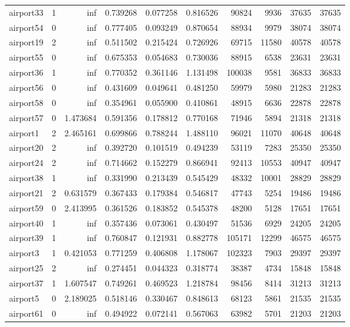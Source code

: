 \documentclass[../../../thesis.tex]{subfiles}
\begin{document}
\begin{longtable}{|l|r|r|r|r|r|r|r|r|r|}
airport33 & 1 & inf & 0.739268 & 0.077258 & 0.816526 & 90824 & 9936 & 37635 & 37635 \\
airport54 & 0 & inf & 0.777405 & 0.093249 & 0.870654 & 88934 & 9979 & 38074 & 38074 \\
airport19 & 2 & inf & 0.511502 & 0.215424 & 0.726926 & 69715 & 11580 & 40578 & 40578 \\
airport55 & 0 & inf & 0.675353 & 0.054683 & 0.730036 & 88915 & 6538 & 23631 & 23631 \\
airport36 & 1 & inf & 0.770352 & 0.361146 & 1.131498 & 100038 & 9581 & 36833 & 36833 \\
airport56 & 0 & inf & 0.431609 & 0.049641 & 0.481250 & 59979 & 5980 & 21283 & 21283 \\
airport58 & 0 & inf & 0.354961 & 0.055900 & 0.410861 & 48915 & 6636 & 22878 & 22878 \\
airport57 & 0 & 1.473684 & 0.591356 & 0.178812 & 0.770168 & 71946 & 5894 & 21318 & 21318 \\
airport1 & 2 & 2.465161 & 0.699866 & 0.788244 & 1.488110 & 96021 & 11070 & 40648 & 40648 \\
airport20 & 2 & inf & 0.392720 & 0.101519 & 0.494239 & 53119 & 7283 & 25350 & 25350 \\
airport24 & 2 & inf & 0.714662 & 0.152279 & 0.866941 & 92413 & 10553 & 40947 & 40947 \\
airport38 & 1 & inf & 0.331990 & 0.213439 & 0.545429 & 48332 & 10001 & 28829 & 28829 \\
airport21 & 2 & 0.631579 & 0.367433 & 0.179384 & 0.546817 & 47743 & 5254 & 19486 & 19486 \\
airport59 & 0 & 2.413995 & 0.361526 & 0.183852 & 0.545378 & 48200 & 5128 & 17651 & 17651 \\
airport40 & 1 & inf & 0.357436 & 0.073061 & 0.430497 & 51536 & 6929 & 24205 & 24205 \\
airport39 & 1 & inf & 0.760847 & 0.121931 & 0.882778 & 105171 & 12299 & 46575 & 46575 \\
airport3 & 1 & 0.421053 & 0.771259 & 0.406808 & 1.178067 & 102323 & 7903 & 29397 & 29397 \\
airport25 & 2 & inf & 0.274451 & 0.044323 & 0.318774 & 38387 & 4734 & 15848 & 15848 \\
airport37 & 1 & 1.607547 & 0.749261 & 0.469523 & 1.218784 & 98456 & 8414 & 31213 & 31213 \\
airport5 & 0 & 2.189025 & 0.518146 & 0.330467 & 0.848613 & 68123 & 5861 & 21535 & 21535 \\
airport61 & 0 & inf & 0.494922 & 0.072141 & 0.567063 & 63982 & 5701 & 21203 & 21203 \\

\end{longtable}
\end{document}
